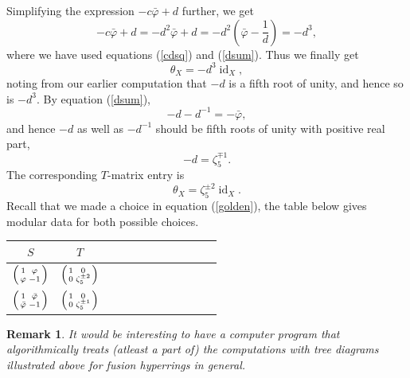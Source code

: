 \documentclass[11pt]{book}
\theoremstyle{Rem}
\newtheorem{Rem}[theorem]{Remark}
\theoremstyle{definition}
\numberwithin{equation}{section}
\newcommand{\tmt}[4]{\left({#1\atop #3}{#2\atop #4}\right)}
\newcommand\inv{^{-1}}
\newcommand\id{\operatorname{id}}
\begin{document}
Simplifying the expression $-c\bar{\varphi} +d$ further, we get \begin{equation}
	-c\bar{\varphi} +d = -d^2\bar{\varphi} +d = -d^2 (\bar{\varphi} - \frac{1}d) = -d^3,
\end{equation}
where we have used equations (\ref{cdsq}) and (\ref{dsum}). Thus we finally get \begin{equation}
	\theta_X = -d^3\id_X,
\end{equation}
noting from our earlier computation that $-d$ is a fifth root of unity, and hence so is $-d^3$.  
By equation (\ref{dsum}), \begin{equation}
	-d-d\inv = -\bar{\varphi},
\end{equation} and hence $-d$ as well as $-d\inv$ should be  fifth roots of  unity with positive real part, \begin{equation}
	-d = \zeta_5^{\mp 1}.
\end{equation} The corresponding $T$-matrix entry is \begin{equation}
	\theta_X = \zeta_5^{\pm 2}\id_X.
\end{equation}
Recall that we made a choice in equation (\ref{golden}), the table below gives modular data for both possible choices.
\begin{center}
\begin{tabular}{ | c  |c | c | c | c  | c | c | c | c | c |c | c |}
\hline
 $S$ & $T$ \\ 
\hline
  $\tmt{1}{\varphi}{\varphi}{-1}$ & $\tmt{1}{0}{0}{\zeta_5^{\pm 2}}$  \\
 \hline
 $\tmt{1}{\bar{\varphi}}{\bar{\varphi}}{-1}$ & $\tmt{1}{0}{0}{\zeta_5^{\pm 1}}$  \\ 
 \hline
\end{tabular}
\end{center}
\begin{Rem}\rm
It would be interesting to have a computer program that algorithmically treats (atleast a part of) the computations with tree diagrams illustrated above for fusion hyperrings in general.
\end{Rem}
\fi
\end{document}

